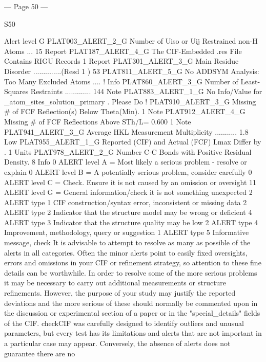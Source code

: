 --- Page 50 ---
 
 
S50 
 
 
 
 Alert level G
PLAT003_ALERT_2_G Number of Uiso or Uij Restrained non-H Atoms ...         15 Report
PLAT187_ALERT_4_G The CIF-Embedded .res File Contains RIGU Records          1 Report
PLAT301_ALERT_3_G Main Residue  Disorder ..............(Resd  1  )        53%
PLAT811_ALERT_5_G No ADDSYM Analysis: Too Many Excluded Atoms ....          ! Info  
PLAT860_ALERT_3_G Number of Least-Squares Restraints .............        144 Note  
PLAT883_ALERT_1_G No Info/Value for _atom_sites_solution_primary .     Please Do !  
PLAT910_ALERT_3_G Missing # of FCF Reflection(s) Below Theta(Min).          1 Note  
PLAT912_ALERT_4_G Missing # of FCF Reflections Above STh/L=  0.600          1 Note  
PLAT941_ALERT_3_G Average HKL Measurement Multiplicity ...........        1.8 Low   
PLAT955_ALERT_1_G Reported (CIF) and Actual (FCF) Lmax Differ by .          1 Units 
PLAT978_ALERT_2_G Number C-C Bonds with Positive Residual Density.          8 Info  
   0 ALERT level A = Most likely a serious problem - resolve or explain
   0 ALERT level B = A potentially serious problem, consider carefully
   0 ALERT level C = Check. Ensure it is not caused by an omission or oversight
  11 ALERT level G = General information/check it is not something unexpected
   2 ALERT type 1 CIF construction/syntax error, inconsistent or missing data
   2 ALERT type 2 Indicator that the structure model may be wrong or deficient
   4 ALERT type 3 Indicator that the structure quality may be low
   2 ALERT type 4 Improvement, methodology, query or suggestion
   1 ALERT type 5 Informative message, check
It is advisable to attempt to resolve as many as possible of the alerts in all categories. Often the
minor alerts point to easily fixed oversights, errors and omissions in your CIF or refinement
strategy, so attention to these fine details can be worthwhile. In order to resolve some of the more
serious problems it may be necessary to carry out additional measurements or structure
refinements. However, the purpose of your study may justify the reported deviations and the more
serious of these should normally be commented upon in the discussion or experimental section of a
paper or in the "special_details" fields of the CIF. checkCIF was carefully designed to identify
outliers and unusual parameters, but every test has its limitations and alerts that are not important
in a particular case may appear. Conversely, the absence of alerts does not guarantee there are no
